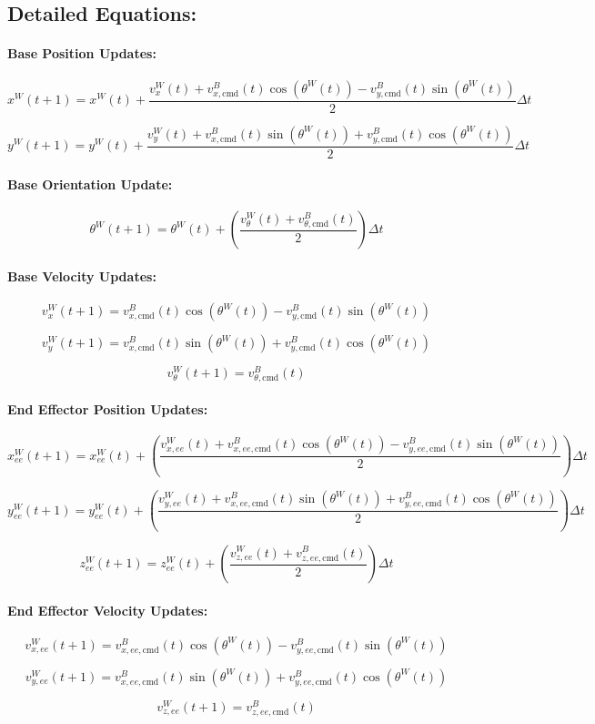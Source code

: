 \documentclass{article}
\begin{document}
\pagebreak
\subsection*{Detailed Equations:}

\paragraph{Base Position Updates:}

\[
x^W(t+1) = x^W(t) + \frac{ v_x^W(t) + v_{x,\text{cmd}}^B(t) \cos(\theta^W(t)) - v_{y,\text{cmd}}^B(t) \sin(\theta^W(t))}{2} \Delta t
\]

\[
y^W(t+1) = y^W(t) + \frac{v_y^W(t) + v_{x,\text{cmd}}^B(t) \sin(\theta^W(t)) + v_{y,\text{cmd}}^B(t) \cos(\theta^W(t))}{2} \Delta t
\]

\paragraph{Base Orientation Update:}

\[
\theta^W(t+1) = \theta^W(t) + \left( \frac{v_\theta^W(t) + v_{\theta,\text{cmd}}^B(t)}{2} \right) \Delta t
\]

\paragraph{Base Velocity Updates:}

\[
v_x^W(t+1) = v_{x,\text{cmd}}^B(t) \cos(\theta^W(t)) - v_{y,\text{cmd}}^B(t) \sin(\theta^W(t))
\]

\[
v_y^W(t+1) = v_{x,\text{cmd}}^B(t) \sin(\theta^W(t)) + v_{y,\text{cmd}}^B(t) \cos(\theta^W(t))
\]

\[
v_\theta^W(t+1) = v_{\theta,\text{cmd}}^B(t)
\]

\paragraph{End Effector Position Updates:}

\[
x_{ee}^W(t+1) = x_{ee}^W(t) + \left( \frac{v_{x,ee}^W(t) + v_{x,ee,\text{cmd}}^B(t) \cos(\theta^W(t)) - v_{y,ee,\text{cmd}}^B(t) \sin(\theta^W(t))}{2} \right) \Delta t
\]

\[
y_{ee}^W(t+1) = y_{ee}^W(t) + \left( \frac{v_{y,ee}^W(t) + v_{x,ee,\text{cmd}}^B(t) \sin(\theta^W(t)) + v_{y,ee,\text{cmd}}^B(t) \cos(\theta^W(t))}{2} \right) \Delta t
\]

\[
z_{ee}^W(t+1) = z_{ee}^W(t) + \left( \frac{v_{z,ee}^W(t) + v_{z,ee,\text{cmd}}^B(t)}{2} \right) \Delta t
\]

\paragraph{End Effector Velocity Updates:}

\[
v_{x,ee}^W(t+1) = v_{x,ee,\text{cmd}}^B(t) \cos(\theta^W(t)) - v_{y,ee,\text{cmd}}^B(t) \sin(\theta^W(t))
\]

\[
v_{y,ee}^W(t+1) = v_{x,ee,\text{cmd}}^B(t) \sin(\theta^W(t)) + v_{y,ee,\text{cmd}}^B(t) \cos(\theta^W(t))
\]

\[
v_{z,ee}^W(t+1) = v_{z,ee,\text{cmd}}^B(t)
\]
\end{document}
